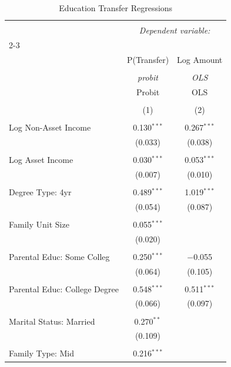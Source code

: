
\begin{table}[!htbp] \centering 
  \caption{Education Transfer Regressions} 
  \label{tab:edu_transfers} 
\begin{tabular}{@{\extracolsep{5pt}}lcc} 
\\[-1.8ex]\hline 
\hline \\[-1.8ex] 
 & \multicolumn{2}{c}{\textit{Dependent variable:}} \\ 
\cline{2-3} 
\\[-1.8ex] & P(Transfer) & Log Amount \\ 
\\[-1.8ex] & \textit{probit} & \textit{OLS} \\ 
 & Probit & OLS \\ 
\\[-1.8ex] & (1) & (2)\\ 
\hline \\[-1.8ex] 
 Log Non-Asset Income & 0.130$^{***}$ & 0.267$^{***}$ \\ 
  & (0.033) & (0.038) \\ 
  & & \\ 
 Log Asset Income & 0.030$^{***}$ & 0.053$^{***}$ \\ 
  & (0.007) & (0.010) \\ 
  & & \\ 
 Degree Type: 4yr & 0.489$^{***}$ & 1.019$^{***}$ \\ 
  & (0.054) & (0.087) \\ 
  & & \\ 
 Family Unit Size & 0.055$^{***}$ &  \\ 
  & (0.020) &  \\ 
  & & \\ 
 Parental Educ: Some Colleg & 0.250$^{***}$ & $-$0.055 \\ 
  & (0.064) & (0.105) \\ 
  & & \\ 
 Parental Educ: College Degree & 0.548$^{***}$ & 0.511$^{***}$ \\ 
  & (0.066) & (0.097) \\ 
  & & \\ 
 Marital Status: Married & 0.270$^{**}$ &  \\ 
  & (0.109) &  \\ 
  & & \\ 
 Family Type: Mid & 0.216$^{***}$ &  \\ 

\end{tabular}
\end{table}
